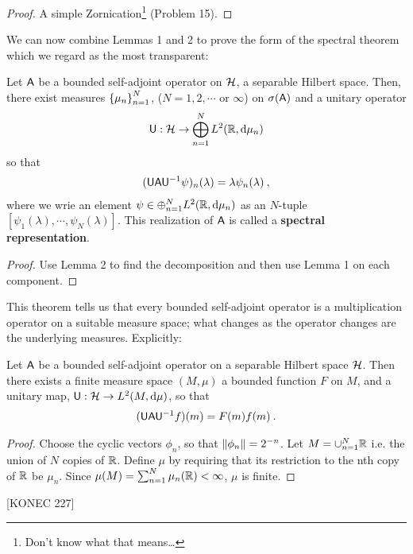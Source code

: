 \begin{proof}
    A simple Zornication\footnote{Don't know what that means\dots} (Problem 15).
\end{proof}

We can now combine Lemmas 1 and 2 to prove the form of the spectral theorem which we regard as the most transparent:

\begin{theorem}
    Let $\mathsf{A}$ be a bounded self-adjoint operator on $\mathcal{H}$, a separable Hilbert space. Then, there exist measures $\left \lbrace \mu_n \right \rbrace_{n=1}^N$, ($N = 1,2,\cdots$ or $\infty$) on $\sigma(\mathsf{A})$ and a unitary operator
    \begin{align}
        \mathsf{U} : \mathcal{H} \to \bigoplus_{n=1}^N L^{2}(\mathbb{R}, \mathrm{d} \mu_n)
    \end{align}
    so that \begin{align}
        (\mathsf{U} \mathsf{A} \mathsf{U}^{-1} \psi)_n (\lambda) = \lambda \psi_n(\lambda) \:,
    \end{align}
    where we wrie an element $\psi \in \oplus_{n=1}^N L^{2}(\mathbb{R}, \mathrm{d} \mu_n)$ as an $N$-tuple $[\psi_1(\lambda), \cdots, \psi_N(\lambda)]$. This realization of $\mathsf{A}$ is called a \textbf{spectral representation}.
\end{theorem}

\begin{proof}
    Use Lemma 2 to find the decomposition and then use Lemma 1 on each component.
\end{proof}

This theorem tells us that every bounded self-adjoint operator is a multiplication operator on a suitable measure space; what changes as the operator changes are the underlying measures. Explicitly:

\begin{corollary}
    Let $\mathsf{A}$ be a bounded self-adjoint operator on a separable Hilbert space $\mathcal{H}$. Then there exists a finite measure space $(M, \mu)$ a bounded function $F$ on $M$, and a unitary map, $ \mathsf{U}: \mathcal{H} \to L^{2}(M, \mathrm{d} \mu)$, so that
    \begin{align}
        (\mathsf{U} \mathsf{A} \mathsf{U}^{-1} f) (m) = F(m) f(m) \:.
    \end{align}
\end{corollary}

\begin{proof}
    Choose the cyclic vectors $\phi_n$, so that $\left \Vert \phi_n \right \Vert = 2^{-n}$. Let $M = \cup_{n=1}^N \mathbb{R}$ i.e. the union of $N$ copies of $\mathbb{R}$. Define $\mu$ by requiring that its restriction to the nth copy of $\mathbb{R}$ be $\mu_n$. Since $\mu(M) = \sum_{n=1}^N \mu_n(\mathbb{R}) < \infty$, $\mu$ is finite.
\end{proof}

[KONEC 227]